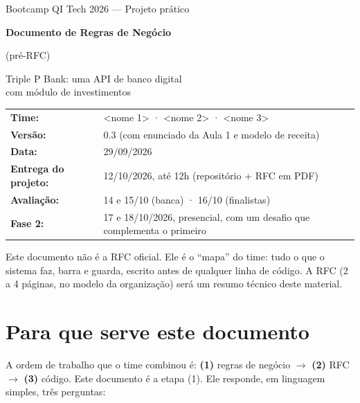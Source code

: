 \documentclass[11pt,a4paper]{article}
\newcommand{\banco}{Triple P Bank}            %
\begin{document}
\begin{titlepage}
\centering
\vspace*{3cm}
{\large Bootcamp QI Tech 2026 --- Projeto prático\par}
\vspace{1.2cm}
{\Huge\bfseries Documento de Regras de Negócio\par}
\vspace{0.4cm}
{\Large (pré-RFC)\par}
\vspace{1.2cm}
{\Large \banco: uma API de banco digital\\ com módulo de investimentos\par}
\vspace{2cm}
\begin{tabular}{ll}
\textbf{Time:} & \textless nome 1\textgreater{} · \textless nome 2\textgreater{} · \textless nome 3\textgreater \\
\textbf{Versão:} & 0.3 (com enunciado da Aula 1 e modelo de receita) \\
\textbf{Data:} & 29/09/2026 \\
\textbf{Entrega do projeto:} & 12/10/2026, até 12h (repositório + RFC em PDF) \\
\textbf{Avaliação:} & 14 e 15/10 (banca) · 16/10 (finalistas) \\
\textbf{Fase 2:} & 17 e 18/10/2026, presencial, com um desafio que complementa o primeiro \\
\end{tabular}
\vfill
{\small Este documento não é a RFC oficial. Ele é o ``mapa'' do time: tudo o que o sistema faz,
barra e guarda, escrito antes de qualquer linha de código. A RFC (2 a 4 páginas, no modelo da
organização) será um resumo técnico deste material.\par}
\end{titlepage}

\tableofcontents
\newpage

\section{Para que serve este documento}

A ordem de trabalho que o time combinou é: \textbf{(1)} regras de negócio $\to$
\textbf{(2)} RFC $\to$ \textbf{(3)} código. Este documento é a etapa (1). Ele responde, em
linguagem simples, três perguntas:
\end{document}
